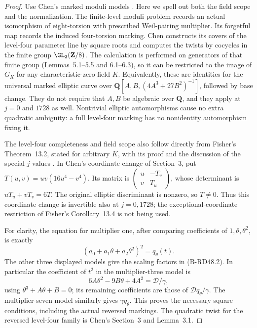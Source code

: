 \begin{proof}
Use Chen's marked moduli models
\cite[Theorems~1.1--1.4, pp.2--3; Section~3, pp.5--7;
Sections~5--6, pp.10--16; Appendix, p.21]{Chen2014Mod8}.
Here we spell out both the field scope and the normalization.
The finite-level moduli problem records an actual isomorphism
of eight-torsion with prescribed Weil-pairing multiplier.
Its forgetful map records the induced four-torsion marking.
Chen constructs its covers of the level-four parameter line
by square roots and computes the twists by cocycles in the
finite group $\GL_2(\mathbf Z/8)$.
The calculation is performed on generators of that finite
group (Lemmas~5.1--5.5 and 6.1--6.3), so it can be restricted
to the image of $G_K$ for any characteristic-zero field $K$.
Equivalently, these are identities for the universal marked
elliptic curve over
$\mathbf Q[A,B,(4A^3+27B^2)^{-1}]$, followed by base change.
They do not require that $A,B$ be algebraic over $\mathbf Q$,
and they apply at $j=0$ and $1728$ as well. Nontrivial elliptic
automorphisms cause no extra quadratic ambiguity: a full
level-four marking has no nonidentity automorphism fixing it.

The level-four completeness and field scope also follow directly
from Fisher's Theorem~13.2, stated for arbitrary $K$, with its
proof and the discussion of the special $j$ values
\cite[Theorem~13.2 and proof, preprint pp.29--30;
discussion and reverse-four twist, p.31]{Fisher2010Hessian}.
In Chen's coordinate change of Section~3, put
$T(u,v)=uv(16u^4-v^4)$.
Its matrix is
$\left(\begin{smallmatrix}u&-T_v\\v&T_u\end{smallmatrix}\right)$,
whose determinant is $uT_u+vT_v=6T$.
The original elliptic discriminant is nonzero, so $T\ne0$.
Thus this coordinate change is invertible also at $j=0,1728$;
the exceptional-coordinate restriction of Fisher's
Corollary~13.4 is not being used.

For clarity, the equation for multiplier one, after comparing
coefficients of $1,\theta,\theta^2$, is exactly
\[
                  (a_0+a_1\theta+a_2\theta^2)^2
                                =q_\theta(t).
\]
The other three displayed models give the scaling factors in
(B-RD48.2). In particular the coefficient of $t^2$ in the
multiplier-three model is
\[
                    6A\theta^2-9B\theta+4A^2
                              =\mathcal D/\gamma,
\]
using $\theta^3+A\theta+B=0$; its remaining coefficients
are those of $\mathcal D q_\theta/\gamma$.
The multiplier-seven model similarly gives $\gamma q_\theta$.
This proves the necessary square conditions, including the
actual reversed markings. The quadratic twist for the
reversed level-four family is Chen's Section~3 and Lemma~3.1.


\end{proof}

